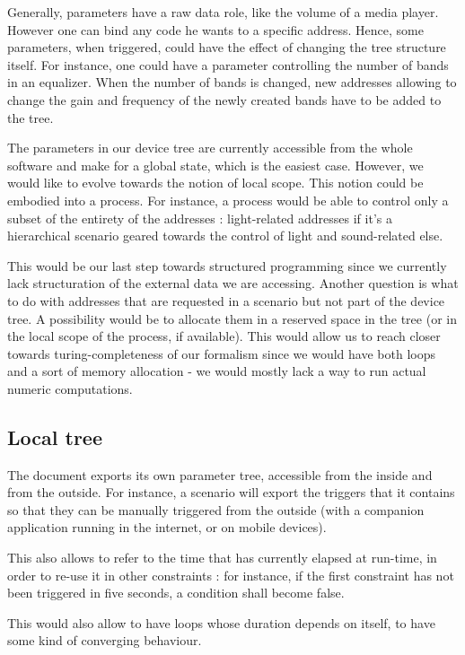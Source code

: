 \documentclass{sigchi}
\begin{document}
Generally, parameters have a raw data role, like the volume of a media player. However one can bind any code he wants to a specific address. Hence, some parameters, when triggered, could have the effect of changing the tree structure itself. For instance, one could have a parameter controlling the number of bands in an equalizer. When the number of bands is changed, new addresses allowing to change the gain and frequency of the newly created bands have to be added to the tree.

The parameters in our device tree are currently accessible from the whole software and make for a global state, which is the easiest case. However, we would like to evolve towards the notion of local scope. This notion could be embodied into a process. For instance, a process would be able to control only a subset of the entirety of the addresses : light-related addresses if it's a hierarchical scenario geared towards the control of light and sound-related else.  

This would be our last step towards structured programming since we currently lack structuration of the external data we are accessing. Another question is what to do with addresses that are requested in a scenario but not part of the device tree. A possibility would be to allocate them in a reserved space in the tree (or in the local scope of the process, if available). This would allow us to reach closer towards turing-completeness of our formalism since we would have both loops and a sort of memory allocation - we would mostly lack a way to run actual numeric computations.


\subsection{Local tree}
The document exports its own parameter tree, accessible from the inside and from the outside.
For instance, a scenario will export the triggers that it contains so that they can be manually triggered from the outside (with a companion application running in the internet, or on mobile devices).

This also allows to refer to the time that has currently elapsed at run-time, in order to re-use it in other constraints : for instance, if the first constraint has not been triggered in five seconds, a condition shall become false.

This would also allow to have loops whose duration depends on itself, to have some kind of converging behaviour.
\end{document}
